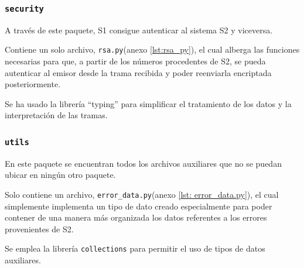 \subsubsection{\texttt{security}}

A través de este paquete, \ac{S1} consigue autenticar al sistema \ac{S2} y viceversa.

Contiene un solo archivo, \texttt{rsa.py}(anexo \ref{lst:rsa_py}), el cual alberga las funciones necesarias para que, a partir de los números procedentes de \ac{S2}, se pueda autenticar al emisor desde la trama recibida y poder reenviarla encriptada posteriormente.

Se ha usado la librería ``typing'' para simplificar el tratamiento de los datos y la interpretación de las tramas.

\subsubsection{\texttt{utils}}

En este paquete se encuentran todos los archivos auxiliares que no se puedan ubicar en ningún otro paquete.

Solo contiene un archivo, \texttt{error\_data.py}(anexo \ref{lst: error_data.py}), el cual simplemente implementa un tipo de dato creado especialmente para poder contener de una manera más organizada los datos referentes a los errores provenientes de \ac{S2}.

Se emplea la librería \texttt{collections} para permitir el uso de tipos de datos auxiliares.




